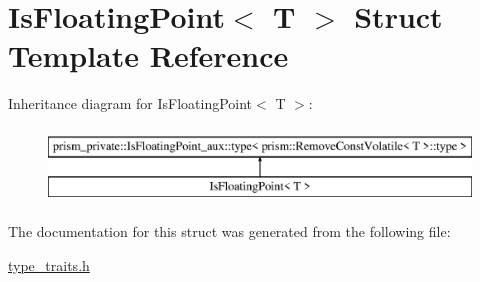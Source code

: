 \hypertarget{struct_is_floating_point}{}\section{Is\+Floating\+Point$<$ T $>$ Struct Template Reference}
\label{struct_is_floating_point}
Inheritance diagram for Is\+Floating\+Point$<$ T $>$\+:\begin{figure}[H]
\begin{center}
\leavevmode
\includegraphics[height=2.000000cm]{struct_is_floating_point}
\end{center}
\end{figure}


The documentation for this struct was generated from the following file\+:\begin{DoxyCompactItemize}
\item 
\hyperlink{type__traits_8h}{type\+\_\+traits.\+h}\end{DoxyCompactItemize}
